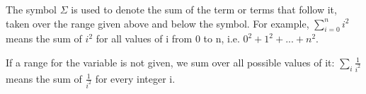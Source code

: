 The symbol $ \Sigma $ is used to denote the sum of the term or terms that follow
it, taken over the range given above and below the symbol. For example,
$ \sum _{i=0} ^{n} i^2 $ 
means the sum of 
$ i^2 $ for all values of i from
0 to n, i.e. $0^{2}+1^{2}+...+n^{2}.$ 
\par
If a range for the variable is not given, we sum over all possible values of it:
$ \sum _{i} \frac{1}{i^2} $ means the sum of $ \frac{1}{i^2} $ for every integer
i.